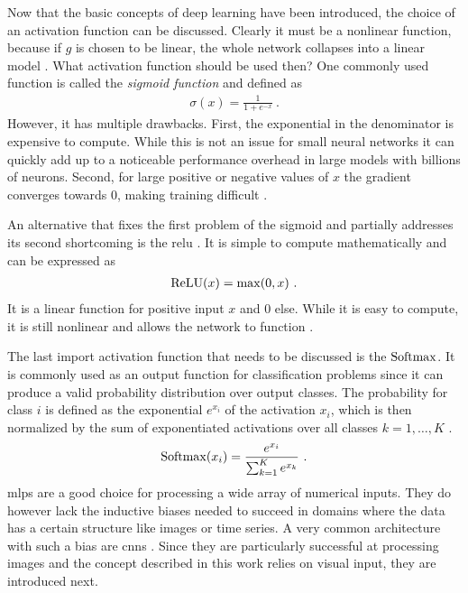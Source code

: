 Now that the basic concepts of deep learning have been introduced, the choice of an activation function can be discussed. Clearly it must be a nonlinear function, because if $g$ is chosen to be linear, the whole network collapses into a linear model \cite{goodfellowDeepLearning2016}. What activation function should be used then? One commonly used function is called the \emph{sigmoid function} and defined as
\begin{gather}\label{eq:sigmoid}
    \sigma (x) = \frac{1}{1+e^{-x}}~.
\end{gather}
However, it has multiple drawbacks. First, the exponential in the denominator is expensive to compute. While this is not an issue for small neural networks it can quickly add up to a noticeable performance overhead in large models with billions of neurons. Second, for large positive or negative values of $x$ the gradient converges towards $0$, making training difficult \cite{goodfellowDeepLearning2016}.

An alternative that fixes the first problem of the sigmoid and partially addresses its second shortcoming is the \gls{relu} \cite{goodfellowDeepLearning2016}. It is simple to compute mathematically and can be expressed as
\begin{gather}\label{eq:relu}
    \operatorname{ReLU}(x) = \max (0, x)~.
\end{gather}
It is a linear function for positive input $x$ and $0$ else. While it is easy to compute, it is still nonlinear and allows the network to function \cite{goodfellowDeepLearning2016}.

The last import activation function that needs to be discussed is the $\operatorname{Softmax}$. It is commonly used as an output function for classification problems since it can produce a valid probability distribution over output classes. The probability for class $i$ is defined as the exponential $e^{x_i}$ of the activation $x_i$, which is then normalized by the sum of exponentiated activations over all classes $k = 1, \ldots, K$ \cite{goodfellowDeepLearning2016}.
\begin{gather}\label{eq:softmax}
    \operatorname{Softmax} (x_i) = \frac{e^{x_i}}{\sum_{k=1}^K e^{x_k}}~.
\end{gather}
\glspl{mlp} are a good choice for processing a wide array of numerical inputs. They do however lack the inductive biases needed to succeed in domains where the data has a certain structure like images or time series. A very common architecture with such a bias are \glspl{cnn} \cite{lecunBackpropagationAppliedHandwritten1989}. Since they are particularly successful at processing images and the concept described in this work relies on visual input, they are introduced next.

